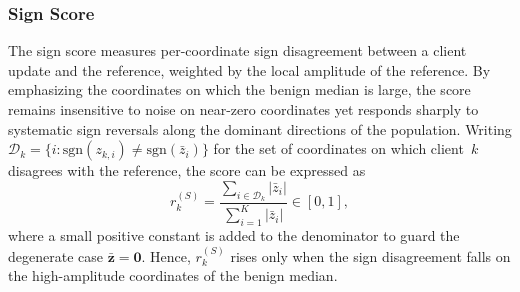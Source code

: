 \documentclass[journal]{IEEEtran}
\begin{document}
\subsubsection{Sign Score}
The sign score measures per-coordinate sign disagreement between a client update and the reference, weighted by the local amplitude of the reference. By emphasizing the coordinates on which the benign median is large, the score remains insensitive to noise on near-zero coordinates yet responds sharply to systematic sign reversals along the dominant directions of the population. Writing $\mathcal{D}_k = \bigl\{ i : \mathrm{sgn}(z_{k,i}) \neq \mathrm{sgn}(\bar z_i) \bigr\}$ for the set of coordinates on which client~$k$ disagrees with the reference, the score can be expressed as
\begin{equation}
r_k^{(S)} = \frac{\sum_{i \in \mathcal{D}_k} |\bar z_i|}{\sum_{i=1}^{K} |\bar z_i|} \in [0,1],
\label{eq:sign_score}
\end{equation}
where a small positive constant is added to the denominator to guard the degenerate case $\bar{\mathbf{z}} = \mathbf{0}$. Hence, $r_k^{(S)}$ rises only when the sign disagreement falls on the high-amplitude coordinates of the benign median.
\end{document}
